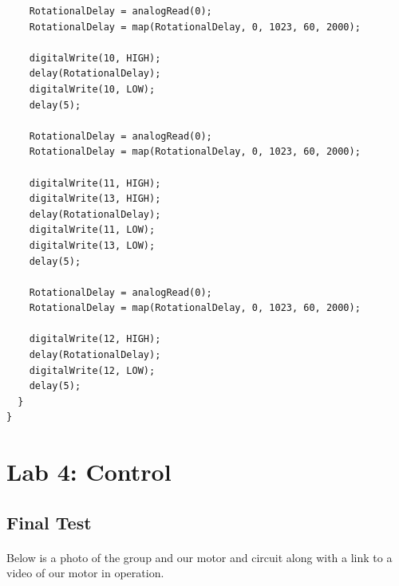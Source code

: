 \documentclass[12pt]{article}
\begin{document}
\begin{verbatim}
    RotationalDelay = analogRead(0);
    RotationalDelay = map(RotationalDelay, 0, 1023, 60, 2000);
    
    digitalWrite(10, HIGH); 
    delay(RotationalDelay);           
    digitalWrite(10, LOW); 
    delay(5);
    
    RotationalDelay = analogRead(0);
    RotationalDelay = map(RotationalDelay, 0, 1023, 60, 2000);
    
    digitalWrite(11, HIGH); 
    digitalWrite(13, HIGH);  
    delay(RotationalDelay);           
    digitalWrite(11, LOW);
    digitalWrite(13, LOW); 
    delay(5);
    
    RotationalDelay = analogRead(0);
    RotationalDelay = map(RotationalDelay, 0, 1023, 60, 2000);
    
    digitalWrite(12, HIGH); 
    delay(RotationalDelay);           
    digitalWrite(12, LOW); 
    delay(5);
  }  
}
				\end{verbatim}
	\newpage
	
	\section{Lab 4: Control}
		\subsection{Final Test}
			\paragraph{}
				Below is a photo of the group and our motor and circuit along with a link to a 
				video of our motor in operation.
				
\end{document}
